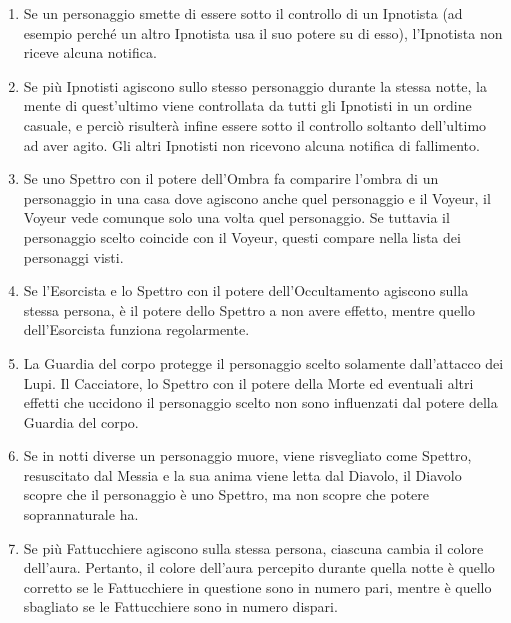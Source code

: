 \documentclass[a4paper,10pt]{article}
\begin{document}
\begin{enumerate}
 \item Se un personaggio smette di essere sotto il controllo di un Ipnotista (ad esempio perché un altro Ipnotista usa il suo potere su di esso), l'Ipnotista non riceve alcuna notifica.
 
 \item Se più Ipnotisti agiscono sullo stesso personaggio durante la stessa notte, la mente di quest'ultimo viene controllata da tutti gli Ipnotisti in un ordine casuale, e perciò risulterà infine essere sotto il controllo soltanto dell'ultimo ad aver agito. Gli altri Ipnotisti non ricevono alcuna notifica di fallimento.
 
 \item Se uno Spettro con il potere dell'Ombra fa comparire l'ombra di un personaggio in una casa dove agiscono anche quel personaggio e il Voyeur, il Voyeur vede comunque solo una volta quel personaggio. Se tuttavia il personaggio scelto coincide con il Voyeur, questi compare nella lista dei personaggi visti.

 \item Se l'Esorcista e lo Spettro con il potere dell'Occultamento agiscono sulla stessa persona, è il potere dello Spettro a non avere effetto, mentre quello dell'Esorcista funziona regolarmente.
 
 \item La Guardia del corpo protegge il personaggio scelto solamente dall'attacco dei Lupi. Il Cacciatore, lo Spettro con il potere della Morte ed eventuali altri effetti che uccidono il personaggio scelto non sono influenzati dal potere della Guardia del corpo.
 
 \item Se in notti diverse un personaggio muore, viene risvegliato come Spettro, resuscitato dal Messia e la sua anima viene letta dal Diavolo, il Diavolo scopre che il personaggio è uno Spettro, ma non scopre che potere soprannaturale ha.
 
 \item Se più Fattucchiere agiscono sulla stessa persona, ciascuna cambia il colore dell'aura. Pertanto, il colore dell'aura percepito durante quella notte è quello corretto se le Fattucchiere in questione sono in numero pari, mentre è quello sbagliato se le Fattucchiere sono in numero dispari.
 

\end{enumerate}
\end{document}
